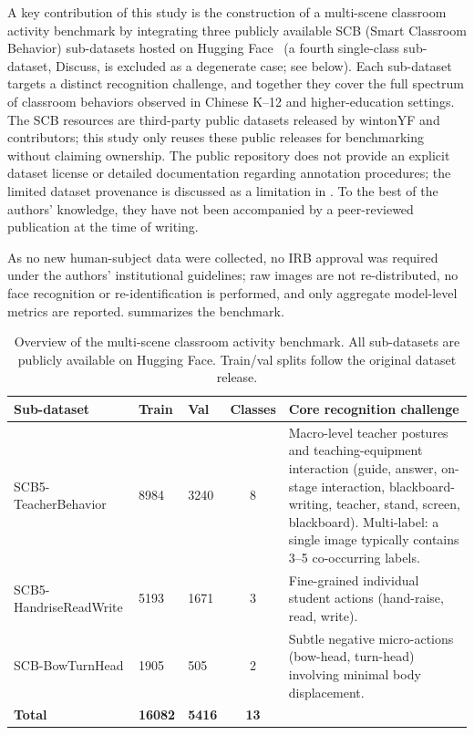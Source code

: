 \documentclass[symmetry,article,submit,pdftex,moreauthors]{Definitions/mdpi}
\begin{document}
A key contribution of this study is the construction of a multi-scene classroom activity benchmark by integrating three publicly available SCB (Smart Classroom Behavior) sub-datasets hosted on Hugging Face~\cite{scb_dataset} (a fourth single-class sub-dataset, Discuss, is excluded as a degenerate case; see below).
Each sub-dataset targets a distinct recognition challenge, and together they cover the full spectrum of classroom behaviors observed in Chinese K--12 and higher-education settings.
The SCB resources are third-party public datasets released by wintonYF and contributors; this study only reuses these public releases for benchmarking without claiming ownership. The public repository does not provide an explicit dataset license or detailed documentation regarding annotation procedures; the limited dataset provenance is discussed as a limitation in . To the best of the authors' knowledge, they have not been accompanied by a peer-reviewed publication at the time of writing.

As no new human-subject data were collected, no IRB approval was required under the authors' institutional guidelines; raw images are not re-distributed, no face recognition or re-identification is performed, and only aggregate model-level metrics are reported.
 summarizes the benchmark.

\begin{table}[H]
\caption{Overview of the multi-scene classroom activity benchmark. All sub-datasets are publicly available on Hugging Face. Train/val splits follow the original dataset release.}
\label{tab:benchmark_overview}
\centering
\small
\begin{tabular}{p{2.8cm}p{1.1cm}p{1.1cm}cp{5.0cm}}
\toprule
\textbf{Sub-dataset} & \textbf{Train} & \textbf{Val} & \textbf{Classes} & \textbf{Core recognition challenge} \\
\midrule
SCB5-TeacherBehavior & 8984 & 3240 & 8 & Macro-level teacher postures and teaching-equipment interaction (guide, answer, on-stage interaction, blackboard-writing, teacher, stand, screen, blackboard). Multi-label: a single image typically contains 3--5 co-occurring labels. \\
\addlinespace
SCB5-HandriseReadWrite & 5193 & 1671 & 3 & Fine-grained individual student actions (hand-raise, read, write). \\
\addlinespace
SCB-BowTurnHead & 1905 & 505 & 2 & Subtle negative micro-actions (bow-head, turn-head) involving minimal body displacement. \\
\midrule
\textbf{Total} & \textbf{16082} & \textbf{5416} & \textbf{13} & \\
\bottomrule
\end{tabular}
\end{table}
\end{document}
